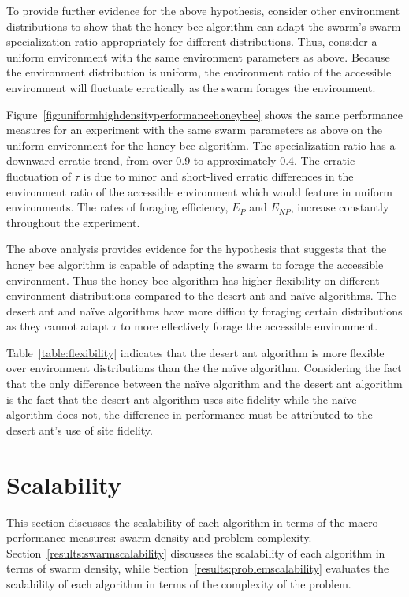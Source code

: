 To provide further evidence for the above hypothesis, consider other environment distributions to show that the honey bee algorithm can adapt the swarm's swarm specialization ratio appropriately for different distributions. Thus, consider a uniform environment with the same environment parameters as above. Because the environment distribution is uniform, the environment ratio of the accessible environment will fluctuate erratically as the swarm forages the environment.  

Figure~\ref{fig:uniformhighdensityperformancehoneybee} shows the same performance measures for an experiment with the same swarm parameters as above on the uniform environment for the honey bee algorithm. The specialization ratio has a downward erratic trend, from over 0.9 to approximately 0.4. The erratic fluctuation of $\tau$ is due to minor and short-lived erratic differences in the environment ratio of the accessible environment which would feature in uniform environments. The rates of foraging efficiency, $E_P$ and $E_{NP}$, increase constantly throughout the experiment. 

The above analysis provides evidence for the hypothesis that suggests that the honey bee algorithm is capable of adapting the swarm to forage the accessible environment. Thus the honey bee algorithm has higher flexibility on different environment distributions compared to the desert ant and na\"ive algorithms. The desert ant and na\"ive algorithms have more difficulty foraging certain distributions as they cannot adapt $\tau$ to more effectively forage the accessible environment.

Table~\ref{table:flexibility} indicates that the desert ant algorithm is more flexible over environment distributions than the the na\"ive algorithm. Considering the fact that the only difference between the na\"ive algorithm and the desert ant algorithm is the fact that the desert ant algorithm uses site fidelity while the na\"ive algorithm does not, the difference in performance must be attributed to the desert ant's use of site fidelity. %

\section{Scalability}
\label{results:scalability}

This section discusses the scalability of each algorithm in terms of the macro performance measures: swarm density and problem complexity. Section~\ref{results:swarmscalability} discusses the scalability of each algorithm in terms of swarm density, while Section~\ref{results:problemscalability} evaluates the scalability of each algorithm in terms of the complexity of the problem.


